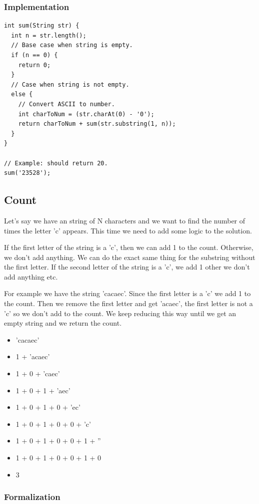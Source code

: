 \documentclass[11pt,oneside]{book}
\begin{document}
\subsubsection{Implementation}

\begin{lstlisting}
int sum(String str) {
  int n = str.length();
  // Base case when string is empty.
  if (n == 0) {
    return 0;
  }
  // Case when string is not empty.
  else {
    // Convert ASCII to number.
    int charToNum = (str.charAt(0) - '0');
    return charToNum + sum(str.substring(1, n));
  }
}

// Example: should return 20.
sum('23528');
\end{lstlisting}

\subsection{Count}

Let's say we have an string of N characters and we want to find the number of times the letter 'c' appears. This time we need to add some logic to the solution.

If the first letter of the string is a 'c', then we can add 1 to the count. Otherwise, we don't add anything. We can do the exact same thing for the substring without the first letter. If the second letter of the string is a 'c', we add 1 other we don't add anything etc.

For example we have the string 'cacaec'. Since the first letter is a 'c' we add 1 to the count. Then we remove the first letter and get 'acaec', the first letter is not a 'c' so we don't add to the count. We keep reducing this way until we get an empty string and we return the count.

\begin{itemize}
\item 'cacaec'
\item 1 + 'acaec'
\item 1 + 0 + 'caec'
\item 1 + 0 + 1 + 'aec'
\item 1 + 0 + 1 + 0 + 'ec'
\item 1 + 0 + 1 + 0 + 0 + 'c'
\item 1 + 0 + 1 + 0 + 0 + 1 + ''
\item 1 + 0 + 1 + 0 + 0 + 1 + 0
\item 3
\end{itemize}

\subsubsection{Formalization}
\end{document}
